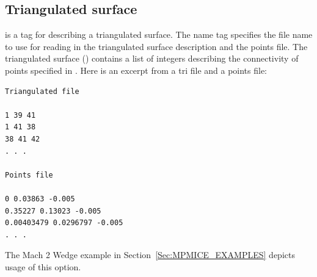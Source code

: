 \subsection{Triangulated surface}
 is a tag for describing a triangulated surface.
The name tag specifies the file name to use for reading in the
triangulated surface description and the points file.  The
triangulated surface () contains a list of integers
describing the connectivity of points specified in .
Here is an excerpt from a tri file and a points file:

\begin{lstlisting}[backgroundcolor=\color{background}]
Triangulated file

1 39 41
1 41 38
38 41 42
. . .

Points file

0 0.03863 -0.005
0.35227 0.13023 -0.005
0.00403479 0.0296797 -0.005
. . .
\end{lstlisting}
The Mach 2 Wedge example in Section~\ref{Sec:MPMICE_EXAMPLES} depicts usage of
this option.

